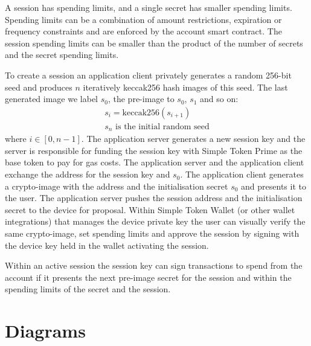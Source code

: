 \documentclass[12pt,a4paper, twocolumn]{article}
\begin{document}
A session has spending limits, and a single secret has smaller
spending limits. Spending limits can be a combination of amount
restrictions, expiration or frequency constraints and are enforced
by the account smart contract. The session spending limits can be
smaller than the product of the number of secrets and the secret
spending limits.

To create a session an application client privately generates
a random 256-bit seed and produces $n$ iteratively keccak256 hash
images of this seed.  The last generated image we label $s_0$,
the pre-image to $s_0$, $s_1$ and so on:
\begin{align}
	s_i = \text{keccak256}(s_{i+1}) \\
	s_n \text{ is the initial random seed} \nonumber
\end{align}
where $i \in [0, n-1]$.
The application server generates a new session key and the server
is responsible for funding the session key with Simple Token Prime
as the base token to pay for gas costs.  The application server and
the application client exchange the address for the session key and
$s_0$.  The application client generates a crypto-image with the address
and the initialisation secret $s_0$ and presents it to the user.
The application server pushes the session address and the initialisation
secret to the device for proposal.
Within Simple Token Wallet (or other wallet integrations) that
manages the device private key the user can visually verify the same
crypto-image, set spending limits and approve the session by signing
with the device key held in the wallet activating the session.

Within an active session the session key can sign transactions to spend
from the account if it presents the next pre-image secret for the session
and within the spending limits of the secret and the session.

\onecolumn
\section{Diagrams}


\end{document}
